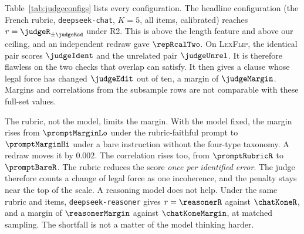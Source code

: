 \documentclass{BVP_JCLLT}
\newcommand{\rev}[1]{#1}
\newcommand{\rev}[1]{{\color{revcol}#1}}
\begin{document}
\begin{table}
\centering
\caption{\rev{Every prompted-judge configuration in this article. \emph{Items}
is \emph{all} for the full \textsc{FrJudge} corpus and all \numedits\
\textsc{LexFlip} probes. It is \emph{sub} for the fixed $100$-edit subsample,
with its identical and unrelated probes. We ran the capability and prompt
comparisons on this subsample to keep the reasoning model affordable. \emph{Cal.}\ marks
isotonic calibration under R2, fitted on each training split. The headline row
is the configuration quoted elsewhere in the article. Rows on the subsample are
comparable with each other, not with the full-set rows.}}\label{tab:judgeconfigs}
\footnotesize
\rev{}
\end{table}

\rev{Table~\ref{tab:judgeconfigs} lists every configuration. The headline
configuration (the French rubric, \texttt{deepseek-chat}, $K=5$, all items,
calibrated) reaches $r=\judgeR_{\pm\judgeRsd}$ under R2. This is above the
length feature and above our ceiling, and an independent redraw gave
$\repRcalTwo$. On \textsc{LexFlip}, the identical pair scores $\judgeIdent$
and the unrelated pair $\judgeUnrel$. It is therefore flawless on the two
checks that overlap can satisfy. It then gives a clause whose legal force has
changed $\judgeEdit$ out of ten, a margin of $\judgeMargin$. Margins and
correlations from the subsample rows are not comparable with these full-set
values.

The rubric, not the model, limits the margin. With the model fixed, the margin
rises from $\promptMarginLo$ under the rubric-faithful prompt to
$\promptMarginHi$ under a bare instruction without the four-type taxonomy. A
redraw moves it by $0.002$. The correlation rises too, from $\promptRubricR$ to
$\promptBareR$. The rubric reduces the score \emph{once per identified error}.
The judge therefore counts a change of legal force as one incoherence, and the
penalty stays near the top of the scale. A reasoning model does not help. Under the same
rubric and items, \texttt{deepseek-reasoner} gives $r=\reasonerR$ against
$\chatKoneR$, and a margin of $\reasonerMargin$ against $\chatKoneMargin$, at
matched sampling. The shortfall is not a matter of the model thinking harder.

}
\end{document}
